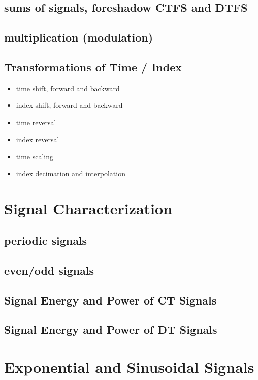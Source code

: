 \documentclass{article}
\begin{document}
\subsection{sums of signals, foreshadow CTFS and DTFS}
\label{sec:orge4464f9}
\subsection{multiplication (modulation)}
\label{sec:orgc1443f6}
\subsection{Transformations of Time / Index}
\label{sec:orgb786926}
\begin{itemize}
\item time shift, forward and backward
\item index shift, forward and backward
\item time reversal
\item index reversal
\item time scaling
\item index decimation and interpolation
\end{itemize}

\newpage
\section{Signal Characterization}
\label{sec:org122fb16}
\subsection{periodic signals}
\label{sec:org5c7f0c9}
\subsection{even/odd signals}
\label{sec:org4721db8}
\subsection{Signal Energy and Power of CT Signals}
\label{sec:org177586b}
\subsection{Signal Energy and Power of DT Signals}
\label{sec:orgc0bedd6}

\newpage
\section{Exponential and Sinusoidal Signals}
\label{sec:orge17b3c1}
\end{document}
